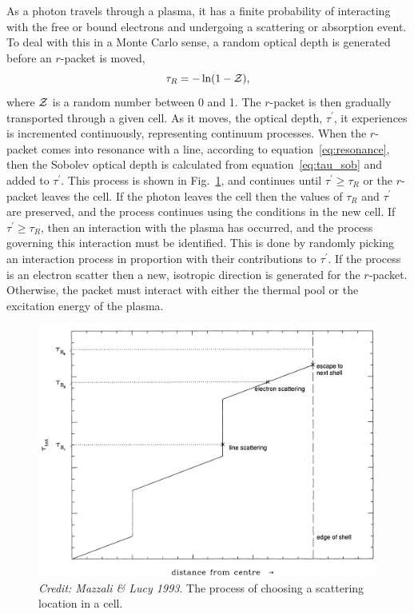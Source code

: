 As a photon travels through a plasma, it has a finite probability
of interacting with the free or bound electrons and undergoing a scattering
or absorption event. To deal with this in a Monte Carlo sense, a random optical 
depth is generated before an $r$-packet is moved,
\begin{equation}
\tau_R = - \ln (1 - {\cal Z}),
\end{equation}
where ${\cal Z}$ is a random number between 0 and 1. 
The $r$-packet is then gradually transported through a given cell. 
As it moves, the optical depth, $\tau^\prime$, it experiences
is incremented continuously, representing continuum processes. When the $r$-packet comes
into resonance with a line, according to equation~\ref{eq:resonance}, then
the Sobolev optical depth is calculated from equation~\ref{eq:tau_sob} and added to 
$\tau^\prime$. This process is shown in Fig.~\ref{fig:scatter_ml93}, and
continues until $\tau^\prime \geq \tau_R$ or the $r$-packet leaves the cell. If the
photon leaves the cell then the values of $\tau_R$ and $\tau^\prime$ are preserved,
and the process continues using the conditions in the new cell. If 
$\tau^\prime \geq \tau_R$, then an interaction with the plasma has occurred, and
the process governing this interaction must be identified. This is done by
randomly picking an interaction process in proportion with their contributions
to $\tau^\prime$. If the process is an electron scatter then a new, isotropic
direction is generated for the $r$-packet. Otherwise, the packet must
interact with either the thermal pool or the excitation energy of the plasma.

\begin{figure}
\centering
\includegraphics[width=1.0\textwidth]{figures/03-radtrans/tau_scat.png}
\caption
{
{\sl Credit: Mazzali \& Lucy 1993}. 
The process of choosing a scattering location in a cell.
} 
\label{fig:scatter_ml93}
\end{figure}

